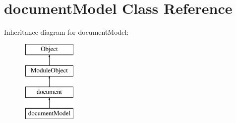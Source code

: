 \hypertarget{classdocumentModel}{}\section{document\+Model Class Reference}
\label{classdocumentModel}
Inheritance diagram for document\+Model\+:\begin{figure}[H]
\begin{center}
\leavevmode
\includegraphics[height=4.000000cm]{classdocumentModel}
\end{center}
\end{figure}
